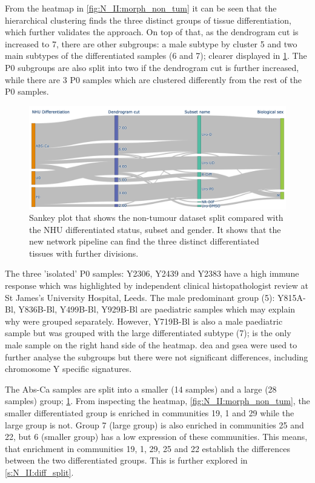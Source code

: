 From the heatmap in \cref{fig:N_II:morph_non_tum} it can be seen that the hierarchical clustering finds the three distinct groups of tissue differentiation, which further validates the approach. On top of that, as the dendrogram cut is increased to 7, there are other subgroups: a male subtype by cluster 5 and two main subtypes of the differentiated samples (6 and 7); clearer displayed in \cref{fig:N_II:non_tum_sankey_comp}. The P0 subgroups are also split into two if the dendrogram cut is further increased, while there are 3 P0 samples which are clustered differently from the rest of the P0 samples. 

\begin{figure}[!t]    
    \centering
    \includegraphics[width=1.0\textwidth,keepaspectratio]{Sections/Network_II/resources/non_tum/non_tum_split.png}
    \caption[Split of the non-tumour dataset]{Sankey plot that shows the non-tumour dataset split compared with the NHU differentiated status, subset and gender. It shows that the new network pipeline can find the three distinct differentiated tissues with further divisions.}
    \label{fig:N_II:non_tum_sankey_comp}
\end{figure}

The three 'isolated' P0 samples: Y2306, Y2439 and Y2383 have a high immune response which was highlighted by independent clinical histopathologist review at St James's University Hospital, Leeds. The male predominant group (5): Y815A-Bl, Y836B-Bl, Y499B-Bl, Y929B-Bl are paediatric samples which may explain why were grouped separately. However, Y719B-Bl is also a male paediatric sample but was grouped with the large differentiated subtype (7); is the only male sample on the right hand side of the heatmap. \acrfull{dea} and \acrfull{gsea} were used to further analyse the subgroups but there were not significant differences, including chromosome Y specific signatures.

The Abs-Ca samples are split into a smaller (14 samples) and a large (28 samples) group; \cref{fig:N_II:non_tum_sankey_comp}. From inspecting the heatmap, \cref{fig:N_II:morph_non_tum}, the smaller differentiated group is enriched in communities 19, 1 and 29 while the large group is not. Group 7 (large group) is also enriched in communities 25 and 22,  but 6 (smaller group) has a low expression of these communities. This means, that enrichment in communities 19, 1, 29, 25 and 22 establish the differences between the two differentiated groups. This is further explored in \cref{s:N_II:diff_split}.


